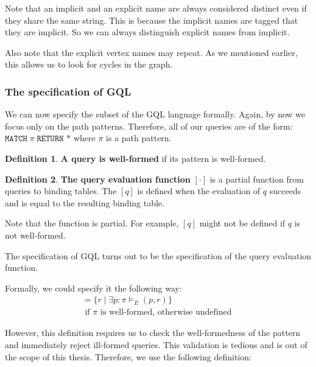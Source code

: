 \documentclass[14pt]{constructor-thesis}
\theoremstyle{definition}
\newtheorem{definition}{Definition}
\begin{document}
Note that an implicit and an explicit name are always considered distinct even if they share the same string. This is because the implicit names are tagged that they are implicit. So we can always distinguish explicit names from implicit.

Also note that the explicit vertex names may repeat. As we mentioned earlier, this allows us to look for cycles in the graph.

\subsubsection{The specification of GQL}

We can now specify the subset of the GQL language formally.
Again, by now we focus only on the path patterns. Therefore, all of our queries are of the form: $\texttt{MATCH} \; \pi \; \texttt{RETURN *}$ where $\pi$ is a path pattern. 

\begin{definition}
  \textbf{A query is well-formed} if its pattern is well-formed.
\end{definition}

\begin{definition}
  \textbf{The query evaluation function} $[ \cdot ]$ is a partial function from queries to binding tables. The $[q]$ is defined when the evaluation of $q$ succeeds and is equal to the resulting binding table.
\end{definition}

Note that the function is partial. For example, $[q]$ might not be defined if $q$ is not well-formed.

The specification of GQL turns out to be the specification of the query evaluation function.

Formally, we could specify it the following way:
\begin{align*}
  [\texttt{MATCH} \; \pi \; \texttt{RETURN *}] = \{ r \mid \exists p : \pi \models_E (p, r) \} \\ \text{ if $\pi$ is well-formed, otherwise undefined }
\end{align*} 

However, this definition requires us to check the well-formedness of the pattern and immediately reject ill-formed queries. This validation is tedious and is out of the scope of this thesis. Therefore, we use the following definition:
\end{document}
